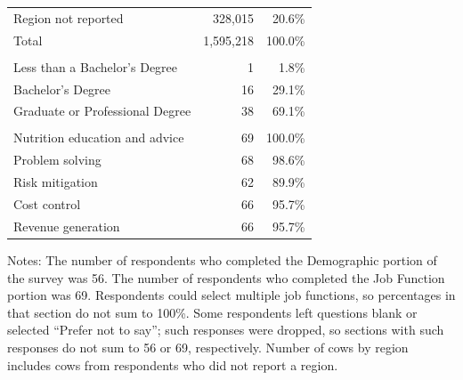 \begin{table}[!h]
\begin{threeparttable}
\begin{tabular}[t]{lrr}
\hspace{1em}Region not reported & 328,015 & 20.6\%\\
\hspace{1em}Total & 1,595,218 & 100.0\%\\
\addlinespace[0.3em]
\multicolumn{3}{l}{\textbf{Education}}\\
\hspace{1em}Less than a Bachelor's Degree & 1 & 1.8\%\\
\hspace{1em}Bachelor's Degree & 16 & 29.1\%\\
\hspace{1em}Graduate or Professional Degree & 38 & 69.1\%\\
\addlinespace[0.3em]
\multicolumn{3}{l}{\textbf{Job Functions}}\\
\hspace{1em}Nutrition education and advice & 69 & 100.0\%\\
\hspace{1em}Problem solving & 68 & 98.6\%\\
\hspace{1em}Risk mitigation & 62 & 89.9\%\\
\hspace{1em}Cost control & 66 & 95.7\%\\
\hspace{1em}Revenue generation & 66 & 95.7\%\\
\bottomrule
\end{tabular}
\begin{tablenotes}
\item Notes: The number of respondents who completed the Demographic portion of the survey was 56. The number of respondents who completed the Job Function portion was 69. Respondents could select multiple job functions, so percentages in that section do not sum to 100\%. Some respondents left questions blank or selected ``Prefer not to say''; such responses were dropped, so sections with such responses do not sum to 56 or 69, respectively. Number of cows by region includes cows from respondents who did not report a region.
\end{tablenotes}
\end{threeparttable}
\end{table}
